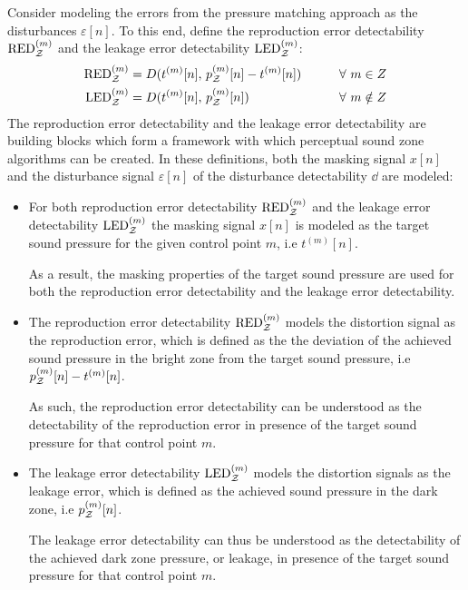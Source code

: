 Consider modeling the errors from the pressure matching approach as the disturbances $\varepsilon[n]$.
To this end, define the reproduction error detectability $\text{RED}^{(m)}_{\mathcal{Z}}$ 
and the leakage error detectability $\text{LED}^{(m)}_{\mathcal{Z}}$:
\begin{alignat}{2}
    \text{RED}^{(m)}_{\mathcal{Z}} &= D(t^{(m)}[n],\,p_{\mathcal{Z}}^{(m)}[n] - t^{(m)}[n]) \qquad&& \forall\,\, m\in Z 
        \label{eq:sound_zone:approach_selection:RED}\\
    \text{LED}^{(m)}_{\mathcal{Z}} &= D(t^{(m)}[n],\,p_{\mathcal{Z}}^{(m)}[n]) \qquad&& \forall\,\, m\notin Z 
        \label{eq:sound_zone:approach_selection:LED} 
\end{alignat}
The reproduction error detectability and the leakage error detectability are building blocks which form a framework
with which perceptual sound zone algorithms can be created.
In these definitions, both the masking signal $x[n]$ and the disturbance signal $\varepsilon[n]$ of the 
disturbance detectability $\dd$ are modeled:  

\begin{itemize}
    \item 
        For both reproduction error detectability $\text{RED}^{(m)}_{\mathcal{Z}}$ 
        and the leakage error detectability $\text{LED}^{(m)}_{\mathcal{Z}}$ the masking signal $x[n]$ is modeled as the target 
        sound pressure for the given control point $m$, i.e $t^{(m)}[n]$. 

        As a result, the masking properties of the target sound pressure are used for both 
        the reproduction error detectability and the leakage error detectability.
    \item 
        The reproduction error detectability $\text{RED}^{(m)}_{\mathcal{Z}}$ models the distortion signal 
        as the reproduction error, which is defined as the 
        the deviation of the achieved sound pressure in the bright zone from the target sound pressure, i.e 
        $p_{\mathcal{Z}}^{(m)}[n] - t^{(m)}[n]$. 

        As such, the reproduction error detectability  
        can be understood as the detectability of the reproduction error in presence of the target sound pressure for that 
        control point $m$.
    \item 
        The leakage error detectability $\text{LED}^{(m)}_{\mathcal{Z}}$ models the distortion signals
        as the leakage error, which is defined as the achieved sound pressure in the dark zone, i.e $p_{\mathcal{Z}}^{(m)}[n]$.  

        The leakage error detectability can thus be understood as the detectability of the achieved dark zone pressure, or 
        leakage, in presence of the target sound pressure for that control point $m$.
\end{itemize}

